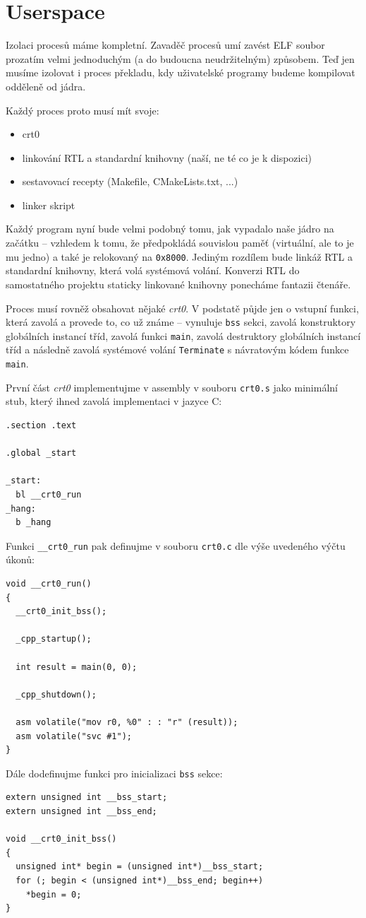 \documentclass{article}
\begin{document}
\section{Userspace}

Izolaci procesů máme kompletní. Zavaděč procesů umí zavést ELF soubor prozatím velmi jednoduchým (a do budoucna neudržitelným) způsobem. Teď jen musíme izolovat i proces překladu, kdy uživatelské programy budeme kompilovat odděleně od jádra.

Každý proces proto musí mít svoje:
\begin{itemize}
	\item crt0
	\item linkování RTL a standardní knihovny (naší, ne té co je k dispozici)
	\item sestavovací recepty (Makefile, CMakeLists.txt, ...)
	\item linker skript
\end{itemize}

Každý program nyní bude velmi podobný tomu, jak vypadalo naše jádro na začátku -- vzhledem k tomu, že předpokládá souvislou paměť (virtuální, ale to je mu jedno) a také je relokovaný na {\tt 0x8000}. Jediným rozdílem bude linkáž RTL a standardní knihovny, která volá systémová volání. Konverzi RTL do samostatného projektu staticky linkované knihovny ponecháme fantazii čtenáře.

Proces musí rovněž obsahovat nějaké \emph{crt0}. V podstatě půjde jen o vstupní funkci, která zavolá a provede to, co už známe -- vynuluje \texttt{bss} sekci, zavolá konstruktory globálních instancí tříd, zavolá funkci \texttt{main}, zavolá destruktory globálních instancí tříd a následně zavolá systémové volání \texttt{Terminate} s návratovým kódem funkce \texttt{main}.

První část \emph{crt0} implementujme v assembly v souboru \texttt{crt0.s} jako minimální stub, který ihned zavolá implementaci v jazyce C:
\begin{lstlisting}[language={[ARM]Assembler}]
.section .text

.global _start

_start:
  bl __crt0_run
_hang:
  b _hang
\end{lstlisting}

Funkci \texttt{\_\_crt0\_run} pak definujme v souboru \texttt{crt0.c} dle výše uvedeného výčtu úkonů:
\begin{lstlisting}
void __crt0_run()
{
  __crt0_init_bss();

  _cpp_startup();

  int result = main(0, 0);
	
  _cpp_shutdown();
	
  asm volatile("mov r0, %0" : : "r" (result));
  asm volatile("svc #1");
}
\end{lstlisting}
Dále dodefinujme funkci pro inicializaci \texttt{bss} sekce:
\begin{lstlisting}
extern unsigned int __bss_start;
extern unsigned int __bss_end;

void __crt0_init_bss()
{
  unsigned int* begin = (unsigned int*)__bss_start;
  for (; begin < (unsigned int*)__bss_end; begin++)
    *begin = 0;
}
\end{lstlisting}
\end{document}
